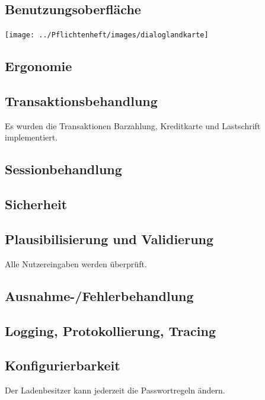 \documentclass[pdftex,12pt,a4paper]{article}
\begin{document}
\subsection{Benutzungsoberfläche}
\texttt{[image: ../Pflichtenheft/images/dialoglandkarte]}

\subsection{Ergonomie}

\subsection{Transaktionsbehandlung}
Es wurden die Transaktionen Barzahlung, Kreditkarte und Lastschrift implementiert.

\subsection{Sessionbehandlung}
\subsection{Sicherheit}
\subsection{Plausibilisierung und Validierung}
Alle Nutzereingaben werden \"uberpr\"uft.
\subsection{Ausnahme-/Fehlerbehandlung}
\subsection{Logging, Protokollierung, Tracing}

\subsection{Konfigurierbarkeit}
Der Ladenbesitzer kann jederzeit die Passwortregeln \"andern.
\end{document}
